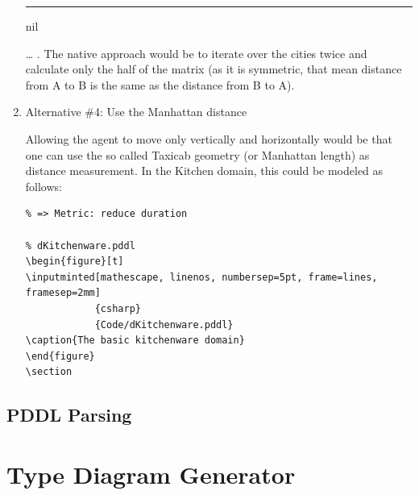 \documentclass[11pt]{report}
\begin{document}
\begin{enumerate}
\begin{center}
{\begin{minipage}[c]{.6\textwidth}
\rule[.8em]{\textwidth}{2pt}

nil\end{minipage}
}
\end{center}
\ldots{} . The native approach would be to iterate over the cities twice
and calculate only the half of the matrix (as it is symmetric, that
mean distance from A to B is the same as the distance from B to A).

\item Alternative \#4: Use the Manhattan distance
\label{sec-4-3-2-4}

Allowing the agent to move only vertically and horizontally would be
that one can use the so called Taxicab geometry (or Manhattan length)
as distance measurement.  In the Kitchen domain, this could be modeled
as follows:

\begin{verbatim}
% => Metric: reduce duration

% dKitchenware.pddl 
\begin{figure}[t]
\inputminted[mathescape, linenos, numbersep=5pt, frame=lines, framesep=2mm]
            {csharp}
            {Code/dKitchenware.pddl}
\caption{The basic kitchenware domain}
\end{figure}
\section
\end{verbatim}

\begin{center}
\end{center}
\end{enumerate}
\subsection{PDDL Parsing}
\label{sec-4-3-3}

\section{Type Diagram Generator}
\label{sec-4-4}
\begin{center}
\end{center}
\end{document}
